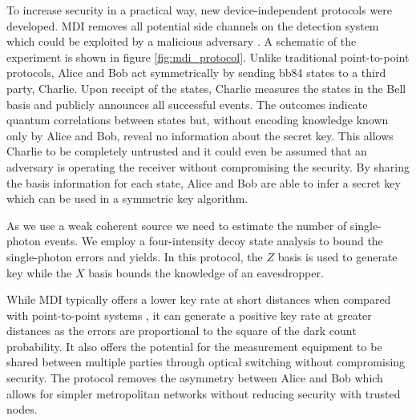 To increase security in a practical way, new device-independent protocols were developed. \ac{MDI} removes all potential side channels on the detection system which could be exploited by a malicious adversary \cite{mdi-qkd}. A schematic of the experiment is shown in figure \ref{fig:mdi_protocol}. Unlike traditional point-to-point protocols, Alice and Bob act symmetrically by sending \ac{bb84} states to a third party, Charlie. Upon receipt of the states, Charlie measures the states in the Bell basis and publicly announces all successful events. The outcomes indicate quantum correlations between states but, without encoding knowledge known only by Alice and Bob, reveal no information about the secret key. This allows Charlie to be completely untrusted and it could even be assumed that an adversary is operating the receiver without compromising the security. By sharing the basis information for each state, Alice and Bob are able to infer a secret key which can be used in a symmetric key algorithm. 

As we use a weak coherent source we need to estimate the number of single-photon events. We employ a four-intensity decoy state analysis \cite{zhou2016} to bound the single-photon errors and yields. In this protocol, the $Z$ basis is used to generate key while the $X$ basis bounds the knowledge of an eavesdropper. 

While \ac{MDI} typically offers a lower key rate at short distances when compared with point-to-point systems \cite{Sibson2017InP}, it can generate a positive key rate at greater distances \cite{yin2016} as the errors are proportional to the square of the dark count probability. It also offers the potential for the measurement equipment to be shared between multiple parties through optical switching without compromising security. The protocol removes the  asymmetry between Alice and Bob which allows for simpler metropolitan networks without reducing security with trusted nodes.




